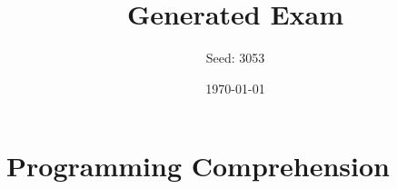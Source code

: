 \documentclass{exam}%
\title{Generated Exam}%
\author{Seed: 3053}%
\date{\today}%
\begin{document}
%
\normalsize%
\maketitle%
\section{Programming Comprehension}%
\label{sec:ProgrammingComprehension}%


%
\end{document}
